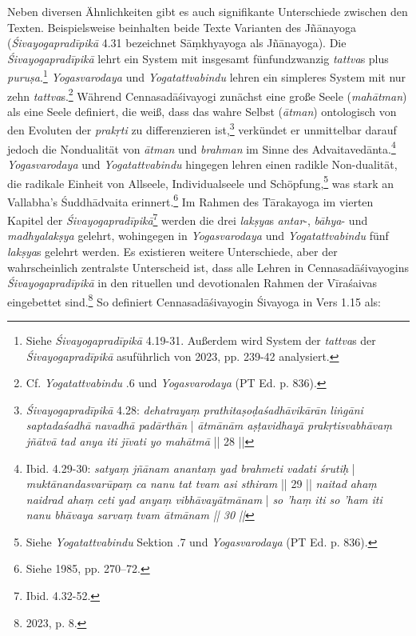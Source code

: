 Neben diversen Ähnlichkeiten gibt es auch signifikante Unterschiede zwischen den Texten. Beispielsweise beinhalten beide Texte Varianten des Jñānayoga (\textit{Śivayogapradīpikā} 4.31 bezeichnet Sāṃkhyayoga als Jñānayoga). Die \textit{Śivayogapradīpikā} lehrt ein System mit insgesamt fünfundzwanzig \textit{tattva}s plus \textit{puruṣa}.\footnote{Siehe \textit{Śivayogapradīpikā} 4.19-31. Außerdem wird System der \textit{tattva}s der \textit{Śivayogapradīpikā} asuführlich von \citeauthor{powell2023} 2023, pp. 239-42 analysiert.} \textit{Yogasvarodaya} und \textit{Yogatattvabindu} lehren ein simpleres System mit nur zehn \textit{tattva}s.\footnote{Cf. \textit{Yogatattvabindu} .6 und \textit{Yogasvarodaya} (PT Ed. p. 836).} Während Cennasadāśivayogi zunächst eine große Seele (\textit{mahātman}) als eine Seele definiert, die weiß, dass das wahre Selbst (\textit{ātman}) ontologisch von den Evoluten der \textit{prakṛti} zu differenzieren ist,\footnote{\textit{Śivayogapradīpikā} 4.28: \textit{dehatrayaṃ prathitaṣoḍaśadhāvikārān liṅgāni saptadaśadhā navadhā padārthān} | \textit{ātmānām aṣṭavidhayā prakṛtisvabhāvaṃ jñātvā tad anya iti jīvati yo mahātmā} || 28 ||} verkündet er unmittelbar darauf jedoch die Nondualität von \textit{ātman} und \textit{brahman} im Sinne des Advaitavedānta.\footnote{Ibid. 4.29-30: \textit{satyaṃ jñānam anantaṃ yad brahmeti vadati śrutiḥ} | \textit{muktānandasvarūpaṃ ca nanu tat tvam asi sthiram} || 29 || \textit{naitad ahaṃ naidrad ahaṃ ceti yad anyaṃ vibhāvayātmānam} | \textit{so 'haṃ iti so 'ham iti nanu bhāvaya sarvaṃ tvam ātmānam || 30 ||}} \textit{Yogasvarodaya} und \textit{Yogatattvabindu} hingegen lehren einen radikle Non-dualität, die radikale Einheit von Allseele, Individualseele und Schöpfung,\footnote{Siehe \textit{Yogatattvabindu} Sektion .7 und \textit{Yogasvarodaya} (PT Ed. p. 836).} was stark an Vallabha's Śuddhādvaita erinnert.\footnote{Siehe \citeauthor{glasenapp1949philosophie} 1985, pp. 270–72.}
 Im Rahmen des Tārakayoga im vierten Kapitel der \textit{Śivayogapradīpikā}\footnote{Ibid. 4.32-52.} werden die drei \textit{lakṣya}s \textit{antar}-, \textit{bāhya}- und \textit{madhyalakṣya} gelehrt, wohingegen in \textit{Yogasvarodaya} und \textit{Yogatattvabindu} fünf \textit{lakṣya}s gelehrt werden.
Es existieren weitere Unterschiede, aber der wahrscheinlich zentralste Unterscheid ist, dass alle Lehren in Cennasadāśivayogins \textit{Śivayogapradīpikā} in den rituellen und devotionalen Rahmen der Vīraśaivas eingebettet sind.\footnote{\citeauthor{powell2023} 2023, p. 8.} So definiert Cennasadāśivayogin Śivayoga in Vers 1.15 als:
